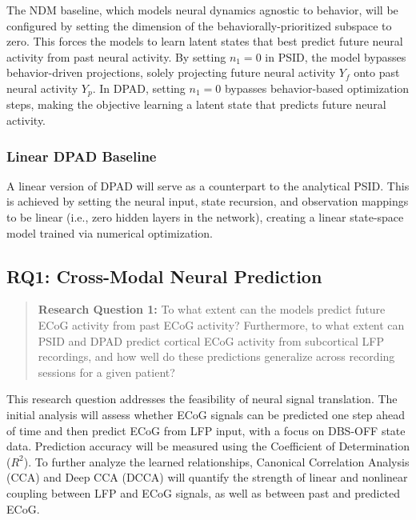 \documentclass[12pt, a4paper]{article}
\begin{document}
The NDM baseline, which models neural dynamics agnostic to behavior, will be configured by setting the dimension of the behaviorally-prioritized subspace to zero. This forces the models to learn latent states that best predict future neural activity from past neural activity. By setting $n_1 = 0$ in PSID, the model bypasses behavior-driven projections, solely projecting future neural activity $Y_f$ onto past neural activity $Y_p$. In DPAD, setting $n_1 = 0$ bypasses behavior-based optimization steps, making the objective learning a latent state that predicts future neural activity.

\subsubsection{Linear DPAD Baseline}

A linear version of DPAD will serve as a counterpart to the analytical PSID. This is achieved by setting the neural input, state recursion, and observation mappings to be linear (i.e., zero hidden layers in the network), creating a linear state-space model trained via numerical optimization.

\subsection{RQ1: Cross-Modal Neural Prediction}

\begin{quote}

    \textbf{Research Question 1:} To what extent can the models predict future ECoG activity from past ECoG activity? Furthermore, to what extent can PSID and DPAD predict cortical ECoG activity from subcortical LFP recordings, and how well do these predictions generalize across recording sessions for a given patient?

\end{quote}

This research question addresses the feasibility of neural signal translation. The initial analysis will assess whether ECoG signals can be predicted one step ahead of time and then predict ECoG from LFP input, with a focus on DBS-OFF state data. Prediction accuracy will be measured using the Coefficient of Determination ($R^2$). To further analyze the learned relationships, Canonical Correlation Analysis (CCA) and Deep CCA (DCCA) will quantify the strength of linear and nonlinear coupling between LFP and ECoG signals, as well as between past and predicted ECoG.
\end{document}
